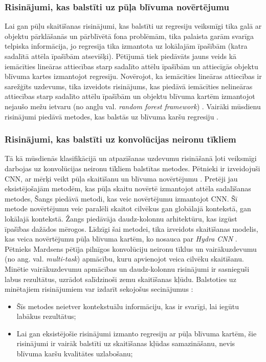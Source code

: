 \subsubsection{Risinājumi, kas balstīti uz pūļa blīvuma novērtējumu}
Lai gan pūļu skaitīšanas risinājumi, kas balstīti uz regresiju veiksmīgi tika galā ar objektu pārklāšanās un pārblīvētā fona problēmām, tika palaista garām svarīga telpiska informācija, jo regresija tika izmantota uz lokālajām īpašībām (katra sadalītā attēla īpašībām atsevišķi). Pētījumā \cite{lempitsky2010learning} tiek piedāvāts jauns veids kā iemācīties lineāras attiecības starp sadalīto attēlu īpašībām un attiecīgās objektu blīvuma kartes izmantojot regresiju. Novērojot, ka iemācīties lineāras attiecības ir sarežģīts uzdevums, tika izveidots risinājums, kas piedāvā iemācīties nelineāras attiecības starp sadalīto attēlu īpašībām un objektu blīvuma kartēm izmantojot nejaušo mežu ietvaru (no angļu val. \textit{random forest framework}) \cite{pham2015count}. Vairāki mūsdienu risinājumi piedāvā metodes, kas balstās uz blīvuma karšu regresiju \cite{wang2016fast,xia2016block}. 

\subsubsection{Risinājumi, kas balstīti uz konvolūcijas neironu tīkliem}
Tā kā mūsdienās klasifikācijā un atpazīšanas uzdevumu risināšanā ļoti veiksmīgi darbojas uz konvolūcijas neironu tīkliem balstītas metodes. Pētnieki ir izveidojuši CNN, ar mērķi veikt pūļa skaitīšanu un blīvuma novērtējumu \cite{wang2015deep,shang2016end,walach2016learning}. Pretēji jau eksistējošajām metodēm, kas pūļa skaitu novērtē izmantojot attēla sadalīšanas metodes, Šangs \cite{shang2016end} piedāvā metodi, kas veic novērtējumu izmantojot CNN. Šī metode novērtējumu veic paralēli skaitot cilvēkus gan globālajā kontekstā, gan lokālajā kontekstā. Žangs \cite{zhang2016single} piedāvāja daudz-kolonnu arhitektūru, kas izgūst īpašības dažādos mērogos. Līdzīgi šai metodei, tika izveidots skaitīšanas modelis, kas veica novērtējumu pūļa blīvuma kartēm, ko nosauca par \textit{Hydra CNN} \cite{onoro2016towards}. Pētnieks Mardsens \cite{marsden2017resnetcrowd} pētīja pilnīgos konvolūciju neironu tīklus un vairākuzdevumu (no ang. val. \textit{multi-task}) apmācību, kuru apvienojot veica cilvēku skaitīšanu. Minētie vairākuzdevumu apmācības un daudz-kolonnu risinājumi ir sasnieguši labus rezultātus, uzrādot salīdzinoši zemu skaitīšanas kļūdu. Balstoties uz minētajiem risinājumiem var izdarīt sekojošus secinājumus \cite{sindagi2017generating}:
\begin{itemize}
	\item Šīs metodes neietver kontekstuālu informāciju, kas ir svarīgi, lai iegūtu labākus rezultātus;
	\item Lai gan eksistējošie risinājumi izmanto regresiju ar pūļa blīvuma kartēm, šie risinājumi ir vairāk balstīti uz skaitīšanas kļūdas samazināšanu, nevis blīvuma karšu kvalitātes uzlabošanu;
\end{itemize}


